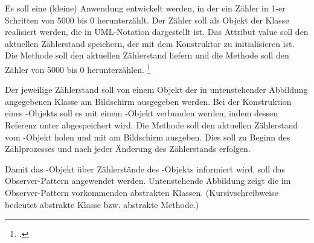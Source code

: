 \documentclass{bschlangaul-aufgabe}
\begin{document}

Es soll eine (kleine) Anwendung entwickelt werden, in der ein Zähler in
1-er Schritten von 5000 bis 0 herunterzählt. Der Zähler soll als Objekt
der Klasse  realisiert werden, die in UML-Notation
dargestellt ist. Das Attribut value soll den aktuellen Zählerstand
speichern, der mit dem Konstruktor zu initialisieren ist. Die Methode
 soll den aktuellen Zählerstand liefern und die Methode
 soll den Zähler von 5000 bis 0 herunterzählen.
\footcite{examen:66116:2018:03}

Der jeweilige Zählerstand soll von einem Objekt der in untenstehender
Abbildung angegebenen Klasse  am Bildschirm ausgegeben
werden. Bei der Konstruktion eines -Objekts soll es mit
einem -Objekt verbunden werden, indem dessen Referenz
unter  abgespeichert wird. Die Methode 
soll den aktuellen Zählerstand vom -Objekt holen und mit
 am Bildschirm ausgeben. Dies soll zu Beginn
des Zählprozesses und nach jeder Änderung des Zählerstands erfolgen.

\begin{center}
\end{center}

\noindent
Damit das -Objekt über Zählerstände des
-Objekts informiert wird, soll das Observer-Pattern
angewendet werden. Untenstehende Abbildung zeigt die im Observer-Pattern
vorkommenden abstrakten Klassen. (Kursivschreibweise bedeutet abstrakte
Klasse bzw. abstrakte Methode.)
\end{document}
